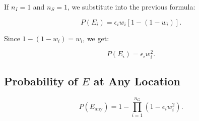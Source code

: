 \documentclass[11pt]{article}
\begin{document}
If $ n_I = 1 $ and $ n_S = 1 $, we substitute into the previous formula:

\begin{equation}
P(E_i) = \epsilon_i w_i \left[ 1 - (1 - w_i) \right].
\end{equation}

Since $ 1 - (1 - w_i) = w_i $, we get:

\begin{equation}
P(E_i) = \epsilon_i w_i^2.
\end{equation}

\subsection{Probability of $ E $ at Any Location}

\begin{equation}
P(E_{\text{any}}) = 1 - \prod_{i=1}^{n_G} \left( 1 - \epsilon_i w_i^2 \right).
\end{equation}
\end{document}
